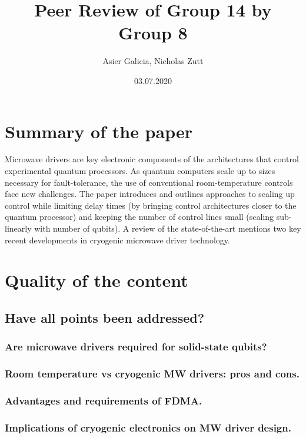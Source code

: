 \documentclass[11pt]{article}
\author{Asier Galicia, Nicholas Zutt}
\date{03.07.2020}
\title{Peer Review of Group 14 by Group 8}
\begin{document}
\maketitle

\section{Summary of the paper}
\label{sec:org469713d}

Microwave drivers are key electronic components of the architectures
that control experimental quantum processors. As quantum computers
scale up to sizes necessary for fault-tolerance, the use of
conventional room-temperature controls face new challenges. The paper
introduces and outlines approaches to scaling up control while
limiting delay times (by bringing control architectures closer to the
quantum processor) and keeping the number of control lines small
(scaling sub-linearly with number of qubits). A review of the
state-of-the-art mentions two key recent developments in cryogenic
microwave driver technology.

\section{Quality of the content}
\label{sec:orgd65fefd}

\subsection{Have all points been addressed?}
\label{sec:orga15ec30}

\subsubsection{Are microwave drivers required for solid-state qubits?}
\label{sec:orgd21ff08}

\subsubsection{Room temperature vs cryogenic MW drivers: pros and cons.}
\label{sec:org10acbb1}

\subsubsection{Advantages and requirements of FDMA.}
\label{sec:org9948d65}

\subsubsection{Implications of cryogenic electronics on MW driver design.}
\label{sec:org461dba0}
\end{document}
